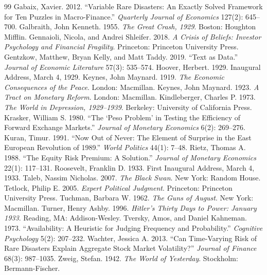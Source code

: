 \documentclass[11pt]{article}
\begin{document}
\begin{thebibliography}{99}
 Gabaix, Xavier. 2012. ``Variable Rare Disasters: An Exactly Solved
Framework for Ten Puzzles in Macro-Finance.'' \emph{Quarterly Journal of Economics} 127(2): 645--700.
 Galbraith, John Kenneth. 1955. \emph{The Great Crash, 1929}.
Boston: Houghton Mifflin.
 Gennaioli, Nicola, and Andrei Shleifer. 2018. \emph{A
Crisis of Beliefs: Investor Psychology and Financial Fragility}. Princeton: Princeton University Press.
 Gentzkow, Matthew, Bryan Kelly, and Matt Taddy. 2019. ``Text
as Data.'' \emph{Journal of Economic Literature} 57(3): 535--574.
 Hoover, Herbert. 1929. Inaugural Address, March 4, 1929.
 Keynes, John Maynard. 1919. \emph{The Economic Consequences of the
Peace}. London: Macmillan.
 Keynes, John Maynard. 1923. \emph{A Tract on Monetary Reform}. London:
Macmillan.
 Kindleberger, Charles P. 1973. \emph{The World in Depression,
1929--1939}. Berkeley: University of California Press.
 Krasker, William S. 1980. ``The `Peso Problem' in Testing the
Efficiency of Forward Exchange Markets.'' \emph{Journal of Monetary Economics} 6(2): 269--276.
 Kuran, Timur. 1991. ``Now Out of Never: The Element of Surprise in the East
European Revolution of 1989.'' \emph{World Politics} 44(1): 7--48.
 Rietz, Thomas A. 1988. ``The Equity Risk Premium: A Solution.''
\emph{Journal of Monetary Economics} 22(1): 117--131.
 Roosevelt, Franklin D. 1933. First Inaugural Address, March 4, 1933.
 Taleb, Nassim Nicholas. 2007. \emph{The Black Swan}. New York: Random House.
 Tetlock, Philip E. 2005. \emph{Expert Political Judgment}. Princeton:
Princeton University Press.
 Tuchman, Barbara W. 1962. \emph{The Guns of August}. New York:
Macmillan.
 Turner, Henry Ashby. 1996. \emph{Hitler's Thirty Days to Power: January
1933}. Reading, MA: Addison-Wesley.
 Tversky, Amos, and Daniel Kahneman. 1973. ``Availability:
A Heuristic for Judging Frequency and Probability.'' \emph{Cognitive Psychology} 5(2): 207--232.
 Wachter, Jessica A. 2013. ``Can Time-Varying Risk of Rare Disasters
Explain Aggregate Stock Market Volatility?'' \emph{Journal of Finance} 68(3): 987--1035.
 Zweig, Stefan. 1942. \emph{The World of Yesterday}. Stockholm:
Bermann-Fischer.
\end{thebibliography}
\end{document}
